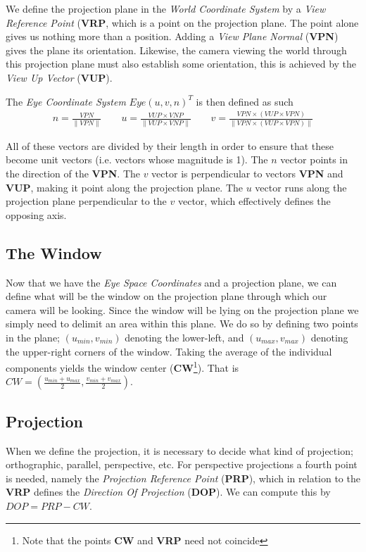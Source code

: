 \documentclass[11pt]{article}
\newcommand{\norm}[1]{\lVert#1\rVert}
\newcommand{\unit}[1]{\frac{#1}{\norm{#1}}}
\begin{document}
We define the projection plane in the {\it World Coordinate System} by a
{\it View Reference Point} ({\bf VRP}, which is a point on the projection
plane. The point alone gives us nothing more than a position. Adding a {\it
View Plane Normal} ({\bf VPN}) gives the plane its orientation. Likewise, the
camera viewing the world through this projection plane must also establish
some orientation, this is achieved by the {\it View Up Vector} ({\bf VUP}).

The {\it Eye Coordinate System} $Eye(u, v, n)^T$ is then defined as such
\begin{align}
    n = \unit{VPN} \qquad
    u = \unit{VUP \times VNP} \qquad
    v = \unit{VPN \times (VUP \times VPN)}
\end{align}

All of these vectors are divided by their length in order to ensure that these
become unit vectors (i.e. vectors whose magnitude is 1). The $n$ vector points
in the direction of the {\bf VPN}. The $v$ vector is perpendicular to vectors
{\bf VPN} and {\bf VUP}, making it point along the projection plane. The $u$
vector runs along the projection plane perpendicular to the $v$ vector, which
effectively defines the opposing axis.

\subsection{The Window}
\label{sec:intro|sub:window}
Now that we have the {\it Eye Space Coordinates} and a projection plane, we
can define what will be the window on the projection plane through which our
camera will be looking. Since the window will be lying on the projection plane
we simply need to delimit an area within this plane. We do so by defining two
points in the plane; $(u_{min}, v_{min})$ denoting the lower-left, and
$(u_{max}, v_{max})$ denoting the upper-right corners of the window. Taking
the average of the individual components yields the window center
({\bf CW}\footnote{Note that the points {\bf CW} and {\bf VRP} need not
coincide}). That is $CW = (\frac{u_{min} + u_{max}}{2}, \frac{v_{min} +
v_{max}}{2})$.

\subsection{Projection}
\label{sec:intro|sub:projection}
When we define the projection, it is necessary to decide what kind of
projection; orthographic, parallel, perspective, etc. For perspective
projections a fourth point is needed, namely the {\it Projection Reference
Point} ({\bf PRP}), which in relation to the {\bf VRP} defines the {\it
Direction Of Projection} ({\bf DOP}). We can compute this by $DOP = PRP - CW$.
\end{document}
